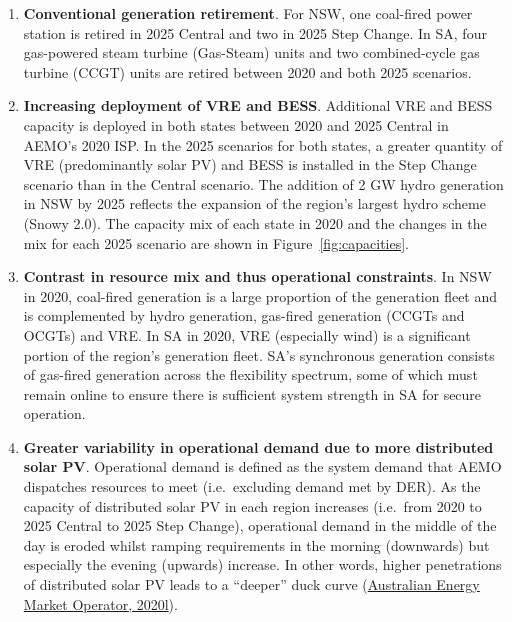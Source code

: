 \documentclass[12pt,a4paper,]{report}
\providecommand{\tightlist}{%
  \setlength{\itemsep}{0pt}\setlength{\parskip}{0pt}}
\begin{document}
\begin{enumerate}
\def\labelenumi{\arabic{enumi}.}
\tightlist
\item
  \textbf{Conventional generation retirement}. For NSW, one coal-fired
  power station is retired in 2025 Central and two in 2025 Step Change.
  In SA, four gas-powered steam turbine (Gas-Steam) units and two
  combined-cycle gas turbine (CCGT) units are retired between 2020 and
  both 2025 scenarios.
\item
  \textbf{Increasing deployment of VRE and BESS}. Additional VRE and
  BESS capacity is deployed in both states between 2020 and 2025 Central
  in AEMO's 2020 ISP. In the 2025 scenarios for both states, a greater
  quantity of VRE (predominantly solar PV) and BESS is installed in the
  Step Change scenario than in the Central scenario. The addition of 2
  GW hydro generation in NSW by 2025 reflects the expansion of the
  region's largest hydro scheme (Snowy 2.0). The capacity mix of each
  state in 2020 and the changes in the mix for each 2025 scenario are
  shown in Figure~\ref{fig:capacities}.
\item
  \textbf{Contrast in resource mix and thus operational constraints}. In
  NSW in 2020, coal-fired generation is a large proportion of the
  generation fleet and is complemented by hydro generation, gas-fired
  generation (CCGTs and OCGTs) and VRE. In SA in 2020, VRE (especially
  wind) is a significant portion of the region's generation fleet. SA's
  synchronous generation consists of gas-fired generation across the
  flexibility spectrum, some of which must remain online to ensure there
  is sufficient system strength in SA for secure operation.
\item
  \textbf{Greater variability in operational demand due to more
  distributed solar PV}. Operational demand is defined as the system
  demand that AEMO dispatches resources to meet (i.e.~excluding demand
  met by DER). As the capacity of distributed solar PV in each region
  increases (i.e.~from 2020 to 2025 Central to 2025 Step Change),
  operational demand in the middle of the day is eroded whilst ramping
  requirements in the morning (downwards) but especially the evening
  (upwards) increase. In other words, higher penetrations of distributed
  solar PV leads to a ``deeper'' duck curve
  (\protect\hyperlink{ref-australianenergymarketoperatorRenewableIntegrationStudy2020b}{Australian
  Energy Market Operator, 2020l}).
\end{enumerate}
\end{document}
